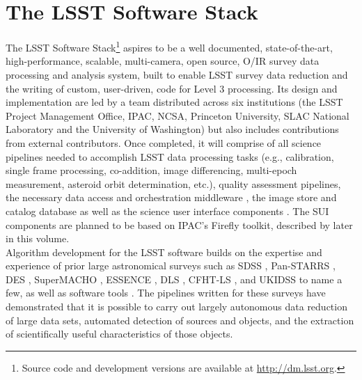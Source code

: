 \documentclass[11pt,twoside]{article}
\begin{document}
\section{The LSST Software Stack}
\label{sec:dmstack}

The LSST Software Stack\footnote{Source code and development versions are available at
\url{http://dm.lsst.org}.} aspires to be a well documented, state-of-the-art,
high-performance, scalable, multi-camera, open source, O/IR survey
data processing and analysis system, built to enable LSST survey data
reduction and the writing of custom, user-driven, code for Level 3
processing. Its design and implementation are led by a team distributed
across six institutions (the LSST Project Management Office, IPAC, NCSA,
Princeton University, SLAC National Laboratory and the University
of Washington) but also includes contributions from external contributors.
Once completed, it will comprise of
all science pipelines \citep{LDM-151, LDM-156} needed to accomplish LSST data processing tasks
(e.g., calibration, single frame processing, co-addition, image
differencing, multi-epoch measurement, asteroid orbit determination,
etc.), quality assessment pipelines, the necessary data
access and orchestration middleware \citep{LDM-152}, the
image store and catalog database \citep{LDM-135,Wang:2011:QDS:2063348.2063364}
as well as the science user interface components \citep[SUI;][]{LDM-131}.
The SUI components are planned to be based on IPAC's Firefly toolkit,
described by \citet{O10-1_adassxxv} later in this volume.
\\

Algorithm development for the LSST software builds on the expertise
and experience of prior large astronomical surveys such as
SDSS \citep{2000AJ....120.1579Y},
Pan-STARRS \citep{2006amos.confE..50M,2010SPIE.7733E..0EK},
DES \citep{DESDM},
SuperMACHO \citep{2005IAUS..225..357B},
ESSENCE \citep{2007ApJ...666..674M},
DLS \citep{2002SPIE.4836...73W},
CFHT-LS \citep{2012MNRAS.427..146H, 2013MNRAS.429.2858M, 2012AJ....143...38G},
and UKIDSS \citep{2007MNRAS.379.1599L}
to name a few, as well as software tools
\citep[e.g., SExtractor,][ascl:1010.064]{1996A&AS..117..393B}.
The pipelines written for these surveys have demonstrated that it is
possible to carry out largely autonomous data reduction of large data
sets, automated detection of sources and objects, and the
extraction of scientifically useful characteristics of those objects.
\end{document}
